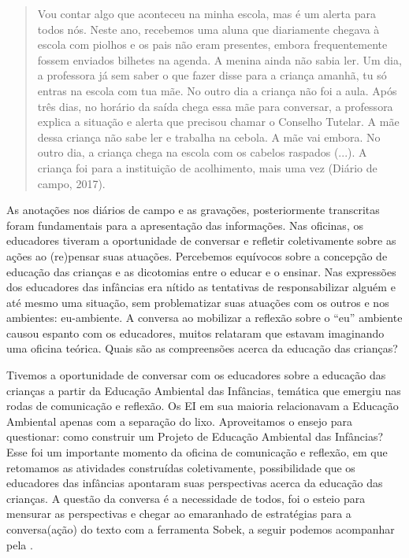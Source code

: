\documentclass{textolivre-html}
\begin{document}
\begin{quote}
Vou contar algo que aconteceu na minha escola, mas é um alerta para todos nós. Neste ano, recebemos uma aluna que diariamente chegava à escola com piolhos e os pais não eram presentes, embora frequentemente fossem enviados bilhetes na agenda. A menina ainda não sabia ler. Um dia, a professora já sem saber o que fazer disse para a criança amanhã, tu só entras na escola com tua mãe. No outro dia a criança não foi a aula. Após três dias, no horário da saída chega essa mãe para conversar, a professora explica a situação e alerta que precisou chamar o Conselho Tutelar. A mãe dessa criança não sabe ler e trabalha na cebola. A mãe vai embora. No outro dia, a criança chega na escola com os cabelos raspados (...). A criança foi para a instituição de acolhimento, mais uma vez (Diário de campo, 2017).
\end{quote}

As anotações nos diários de campo e as gravações, posteriormente transcritas foram fundamentais para a apresentação das informações. Nas oficinas, os educadores tiveram a oportunidade de conversar e refletir coletivamente sobre as ações ao (re)pensar suas atuações. Percebemos equívocos sobre a concepção de educação das crianças e as dicotomias entre o educar e o ensinar. Nas expressões dos educadores das infâncias era nítido as tentativas de responsabilizar alguém e até mesmo uma situação, sem problematizar suas atuações com os outros e nos ambientes: eu-ambiente. A conversa ao mobilizar a reflexão sobre o “eu” ambiente causou espanto com os educadores, muitos relataram que estavam imaginando uma oficina teórica. Quais são as compreensões acerca da educação das crianças? 

Tivemos a oportunidade de conversar com os educadores sobre a educação das crianças a partir da Educação Ambiental das Infâncias, temática que emergiu nas rodas de comunicação e reflexão. Os EI em sua maioria relacionavam a Educação Ambiental apenas com a separação do lixo. Aproveitamos o ensejo para questionar: como construir um Projeto de Educação Ambiental das Infâncias? Esse foi um importante momento da oficina de comunicação e reflexão, em que retomamos as atividades construídas coletivamente, possibilidade que os educadores das infâncias apontaram suas perspectivas acerca da educação das crianças. A questão da conversa é a necessidade de todos, foi o esteio para mensurar as perspectivas e chegar ao emaranhado de estratégias para a conversa(ação) do texto com a ferramenta Sobek, a seguir podemos acompanhar pela . 
\end{document}
